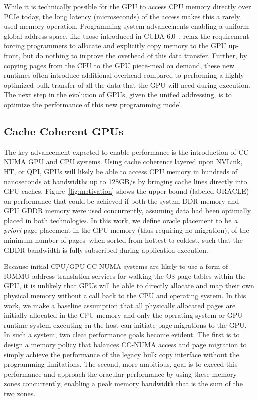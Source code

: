 While it is technically possible for the GPU to access CPU memory directly over PCIe today, the long
latency (microseconds) of the access makes this a rarely used memory operation. 
Programming system
advancements enabling a uniform global address space, like those introduced in
CUDA 6.0~\cite{cuda}, relax the
requirement forcing programmers to allocate and explicitly copy memory to the GPU up-front, but
do nothing to improve the overhead of this data transfer. Further, by copying pages from the CPU to the GPU 
piece-meal on demand, these new runtimes often introduce additional overhead compared to
performing a highly optimized bulk transfer of all the data that the GPU will need during execution.
The next step in the evolution of GPUs, given the unified addressing, is
to optimize the performance of this new programming model. 

\subsection {Cache Coherent GPUs}

The key advancement expected to enable
performance is the introduction of CC-NUMA GPU and CPU systems.  Using cache coherence layered upon NVLink, HT, or QPI, GPUs will
likely be able to access CPU memory in hundreds of nanoseconds at bandwidths up to 128GB/s by bringing
cache lines directly into GPU caches. Figure~\ref{fig:motivation} shows the upper bound (labeled ORACLE) on performance
that could be achieved if both the system DDR memory and GPU GDDR memory were used concurrently, assuming data had 
been optimally placed in both technologies.  In this work, we define oracle placement to be \emph{a priori} page placement
in the GPU memory (thus requiring no migration), of the minimum number of pages, when sorted from hottest to coldest, 
such that the GDDR bandwidth is fully subscribed during application execution.

Because initial CPU/GPU CC-NUMA systems are likely to use a form of IOMMU address translation services 
for walking the OS page tables within the GPU,  it is unlikely that GPUs will be able to directly
allocate and map their own physical memory without a call back to the CPU and operating system.
In this work, we make a baseline assumption that all physically allocated pages are initially allocated
in the CPU memory and only the operating system or GPU runtime system executing on the host can initiate
page migrations to the GPU\@.  In such a system, two clear performance goals become evident.
The first is to design a memory policy that balances CC-NUMA access and page migration to simply achieve the 
performance of the legacy bulk copy interface without the programming limitations.  The second, more ambitious, goal
is to exceed this performance and approach the oracular performance by using these memory zones concurrently, enabling 
a peak memory bandwidth that is the sum of the two zones.

